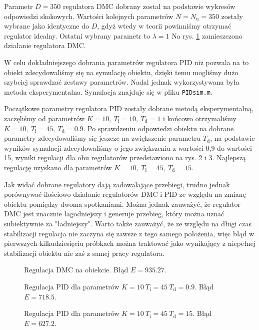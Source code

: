 Parametr $ D = 350 $ regulatora DMC dobrany został na podstawie wykresów odpowiedzi skokowych. Wartości kolejnych parametrów $ N = N_\mathrm{u} = 350 $ zostały wybrane jako identyczne do $ D $, gdyż wtedy w teorii powinniśmy otrzymać regulator idealny. Ostatni wybrany parametr to $ \lambda = 1 $ Na rys. \ref{R7} zamieszczono działanie regulatora DMC.

W celu dokładniejszego dobrania parametrów regulatora PID niż pozwala na to obiekt zdecydowaliśmy się na symulację obiektu, dzięki temu mogliśmy dużo szybciej sprawdzać zestawy parametrów. Nadal jednak wykorzystywana była metoda eksperymentalna. Symulacja znajduje się w pliku \verb+PIDsim.m+.

Początkowe parametry regulatora PID zostały dobrane metodą eksperymentalną, zaczęliśmy od parametrów $K = 10, ~ T_\mathrm{i} = 10, ~ T_\mathrm{d} = \num{1}$ i końcowo otrzymaliśmy $K = 10, ~ T_\mathrm{i} = 45, ~ T_\mathrm{d} = \num{0.9}$. Po sprawdzeniu odpowiedzi obiektu na dobrane parametry zdecydowaliśmy się jeszcze na zwiększenie parametru $T_\mathrm{d}$, na podstawie wyników symulacji zdecydowaliśmy o jego zwiększeniu z wartości 0,9 do wartości 15, wyniki regulacji dla obu regulatorów przedstawiono na rys. \ref{R8} i \ref{R9}. Najlepszą regulację uzyskano dla parametrów $K = 10, ~ T_\mathrm{i} = 45, ~ T_\mathrm{d} = \num{15}$.

Jak widać dobrane regulatory dają zadowalające przebiegi, trudno jednak porównywać ilościowo działanie regulatorów DMC i PID ze względu na zmianę obiektu pomiędzy dwoma spotkaniami. Można jednak zauważyć, że regulator DMC jest znacznie łagodniejszy i generuje przebieg, który można uznać subiektywnie za "ładniejszy". Warto także zauważyć, że ze względu na długi czas stabilizacji regulacja nie zaczyna się zawsze z tego samego położenia, więc błąd w pierwszych kilkudziesięciu próbkach można traktować jako wynikający z niepełnej stabilizacji obiektu nie zaś z samej pracy regulatora.

\begin{figure}[ht]
\centering

\caption{Regulacja DMC na obiekcie. Błąd $E = \num{935.27}$.}
\label{R7}
\end{figure}

\begin{figure}[ht]
\centering

\caption{Regulacja PID dla parametrów $K = 10 ~ T_\mathrm{i} = 45 ~ T_\mathrm{d} = \num{0.9}$. Błąd $E = \num{718.5}$.}
\label{R8}
\end{figure}

\begin{figure}[ht]
\centering

\caption{Regulacja PID dla parametrów $K = 10 ~ T_\mathrm{i} = 45 ~ T_\mathrm{d} = \num{15}$. Błąd $E = \num{627.2}$.}
\label{R9}
\end{figure}
